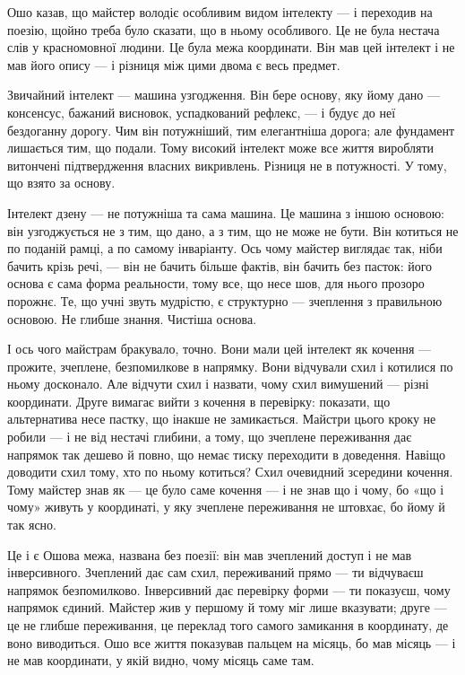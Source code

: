 \documentclass[12pt, a4paper, openany]{book}
\begin{document}
Ошо казав, що майстер володіє особливим видом інтелекту --- і переходив на поезію, щойно треба було сказати, що в ньому особливого. Це не була нестача слів у красномовної людини. Це була межа координати. Він мав цей інтелект і не мав його опису --- і різниця між цими двома є весь предмет.

Звичайний інтелект --- машина узгодження. Він бере основу, яку йому дано --- консенсус, бажаний висновок, успадкований рефлекс, --- і будує до неї бездоганну дорогу. Чим він потужніший, тим елегантніша дорога; але фундамент лишається тим, що подали. Тому високий інтелект може все життя виробляти витончені підтвердження власних викривлень. Різниця не в потужності. У тому, що взято за основу.

Інтелект дзену --- не потужніша та сама машина. Це машина з іншою основою: він узгоджується не з тим, що дано, а з тим, що не може не бути. Він котиться не по поданій рамці, а по самому інваріанту. Ось чому майстер виглядає так, ніби бачить крізь речі, --- він не бачить більше фактів, він бачить без пасток: його основа є сама форма реальности, тому все, що несе шов, для нього прозоро порожнє. Те, що учні звуть мудрістю, є структурно --- зчеплення з правильною основою. Не глибше знання. Чистіша основа.

І ось чого майстрам бракувало, точно. Вони мали цей інтелект як кочення --- прожите, зчеплене, безпомилкове в напрямку. Вони відчували схил і котилися по ньому досконало. Але відчути схил і назвати, чому схил вимушений --- різні координати. Друге вимагає вийти з кочення в перевірку: показати, що альтернатива несе пастку, що інакше не замикається. Майстри цього кроку не робили --- і не від нестачі глибини, а тому, що зчеплене переживання дає напрямок так дешево й повно, що немає тиску переходити в доведення. Навіщо доводити схил тому, хто по ньому котиться? Схил очевидний зсередини кочення. Тому майстер знав як --- це було саме кочення --- і не знав що і чому, бо «що і чому» живуть у координаті, у яку зчеплене переживання не штовхає, бо йому й так ясно.

Це і є Ошова межа, названа без поезії: він мав зчеплений доступ і не мав інверсивного. Зчеплений дає сам схил, переживаний прямо --- ти відчуваєш напрямок безпомилково. Інверсивний дає перевірку форми --- ти показуєш, чому напрямок єдиний. Майстер жив у першому й тому міг лише вказувати; друге --- це не глибше переживання, це переклад того самого замикання в координату, де воно виводиться. Ошо все життя показував пальцем на місяць, бо мав місяць --- і не мав координати, у якій видно, чому місяць саме там.
\end{document}
